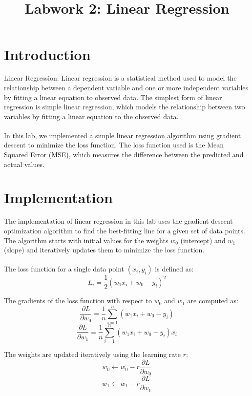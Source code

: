 \documentclass{article}
\title{Labwork 2: Linear Regression}
\begin{document}
\maketitle

\setlength\parindent{0pt}

\section{Introduction}

Linear Regression:
Linear regression is a statistical method used to model the relationship between a dependent variable 
and one or more independent variables by fitting a linear equation to observed data. The simplest form 
of linear regression is simple linear regression, which models the relationship between two variables 
by fitting a linear equation to the observed data.\\
\\
In this lab, we implemented a simple linear regression algorithm using gradient descent to minimize the 
loss function. The loss function used is the Mean Squared Error (MSE), which measures the difference 
between the predicted and actual values.

\section{Implementation}

The implementation of linear regression in this lab uses the gradient descent optimization algorithm to 
find the best-fitting line for a given set of data points. The algorithm starts with initial values for 
the weights $w_0$ (intercept) and $w_1$ (slope) and iteratively updates them to minimize the loss function.\\
\\
The loss function for a single data point $(x_i, y_i)$ is defined as:\\
\[L_i = \frac{1}{2} \left( w_1 x_i + w_0 - y_i \right)^2\]

The gradients of the loss function with respect to $w_0$ and $w_1$ are computed as:\\
\[\frac{\partial L}{\partial w_0} = \frac{1}{n} \sum_{i=1}^n \left( w_1 x_i + w_0 - y_i \right)\]
\[\frac{\partial L}{\partial w_1} = \frac{1}{n} \sum_{i=1}^n \left( w_1 x_i + w_0 - y_i \right) x_i\]

The weights are updated iteratively using the learning rate $r$:\\
\[w_0 \leftarrow w_0 - r \frac{\partial L}{\partial w_0}\]
\[w_1 \leftarrow w_1 - r \frac{\partial L}{\partial w_1}\]
\end{document}
